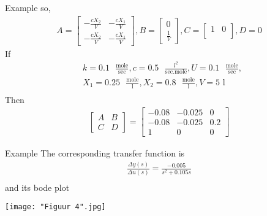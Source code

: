 \begin{frame}{Example}
so,
\begin{align*}
A=\begin{bmatrix}
  -\frac{cX_2}{V} & -\frac{cX_1}{V} \\
  -\frac{cX_2}{V} & -\frac{cX_1}{V}
 \end{bmatrix}
,B=\begin{bmatrix}
  0 \\
  \frac{1}{V}
 \end{bmatrix}
,C=\begin{bmatrix}
  1 & 0\\
 \end{bmatrix}
,D=0
\end{align*}
If
\begin{align*}
&k = 0.1\text{ } \frac{\text{mole}}{\text{sec}}, c = 0.5\text{ } \frac{l^2}{\text{sec.mole}}, U = 0.1\text{ } \frac{\text{mole}}{\text{sec}},\\
&X_1 = 0.25\text{ } \frac{\text{mole}}{\text{l}}, X_2 = 0.8\text{ } \frac{\text{mole}}{\text{l}}, V = 5\text{ l}\\
\end{align*}
\vspace{-0.8cm}
Then
\begin{align*}
{
\left[
    \begin{array}{c|c}
        A & B \\ \hline
        C & D
    \end{array}
\right]
=
\left[
    \begin{array}{cc|c}
        -0.08 & -0.025 &0 \\ 
        -0.08 & -0.025 &0.2\\ \hline
        1 & 0 & 0
    \end{array}
\right]
}
\end{align*}   
\end{frame}

\begin{frame}{Example}
The corresponding transfer function is
\begin{align*}
\frac{\Delta y(s)}{\Delta u(s)} = \frac{-0.005}{s^2+0.105s}\\
\end{align*}
\vspace{-0.4cm}
and its bode plot\\
\begin{center}
\texttt{[image: "Figuur 4".jpg]}
\end{center}
\end{frame}


